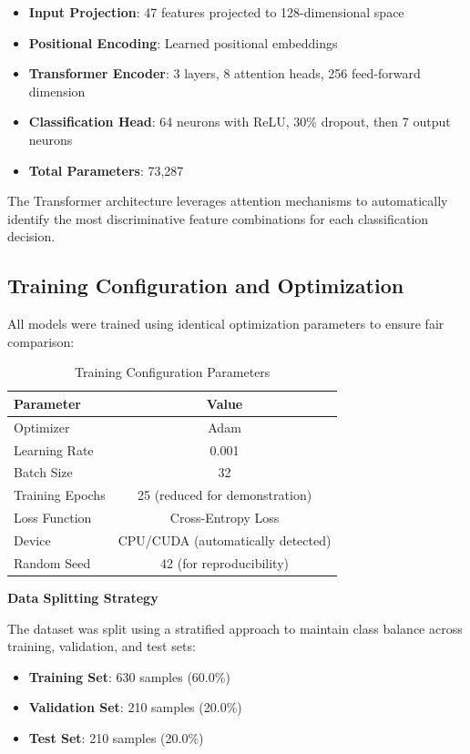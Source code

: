 \documentclass[12pt,a4paper]{article}
\begin{document}
\begin{itemize}
\item \textbf{Input Projection}: 47 features projected to 128-dimensional space
\item \textbf{Positional Encoding}: Learned positional embeddings
\item \textbf{Transformer Encoder}: 3 layers, 8 attention heads, 256 feed-forward dimension
\item \textbf{Classification Head}: 64 neurons with ReLU, 30\% dropout, then 7 output neurons
\item \textbf{Total Parameters}: 73,287
\end{itemize}

The Transformer architecture leverages attention mechanisms to automatically identify the most discriminative feature combinations for each classification decision.

\subsection{Training Configuration and Optimization}

All models were trained using identical optimization parameters to ensure fair comparison:

\begin{table}[H]
\centering
\caption{Training Configuration Parameters}
\label{tab:training_config}
\begin{tabular}{@{}lc@{}}
\toprule
\textbf{Parameter} & \textbf{Value} \\
\midrule
Optimizer & Adam \\
Learning Rate & 0.001 \\
Batch Size & 32 \\
Training Epochs & 25 (reduced for demonstration) \\
Loss Function & Cross-Entropy Loss \\
Device & CPU/CUDA (automatically detected) \\
Random Seed & 42 (for reproducibility) \\
\bottomrule
\end{tabular}
\end{table}

\textbf{Data Splitting Strategy}

The dataset was split using a stratified approach to maintain class balance across training, validation, and test sets:

\begin{itemize}
\item \textbf{Training Set}: 630 samples (60.0\%)
\item \textbf{Validation Set}: 210 samples (20.0\%)
\item \textbf{Test Set}: 210 samples (20.0\%)
\end{itemize}
\end{document}
